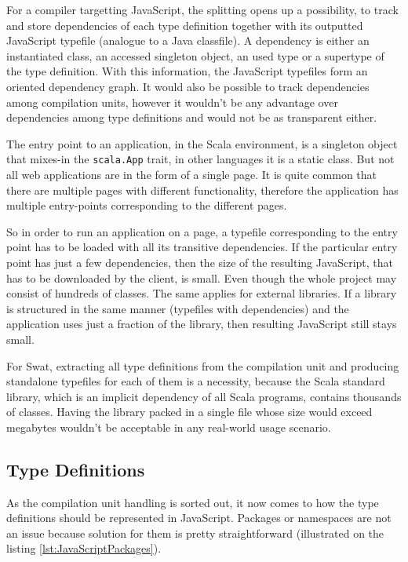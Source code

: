 \documentclass[12pt,a4paper]{report}
\begin{document}
For a compiler targetting JavaScript, the splitting opens up a possibility, to track and store dependencies of each type definition together with its outputted JavaScript typefile (analogue to a Java classfile). A dependency is either an instantiated class, an accessed singleton object, an used type or a supertype of the type definition. With this information, the JavaScript typefiles form an oriented dependency graph. It would also be possible to track dependencies among compilation units, however it wouldn't be any advantage over dependencies among type definitions and would not be as transparent either.

The entry point to an application, in the Scala environment, is a singleton object that mixes-in the \texttt{scala.App} trait, in other languages it is a static class. But not all web applications are in the form of a single page. It is quite common that there are multiple pages with different functionality, therefore the application has multiple entry-points corresponding to the different pages. 

So in order to run an application on a page, a typefile corresponding to the entry point has to be loaded with all its transitive dependencies. If the particular entry point has just a few dependencies, then the size of the resulting JavaScript, that has to be downloaded by the client, is small. Even though the whole project may consist of hundreds of classes. The same applies for external libraries. If a library is structured in the same manner (typefiles with dependencies) and the application uses just a fraction of the library, then resulting JavaScript still stays small.

For Swat, extracting all type definitions from the compilation unit and producing standalone typefiles for each of them is a necessity, because the Scala standard library\cite{ScalaLibrary}, which is an implicit dependency of all Scala programs, contains thousands of classes. Having the library packed in a single file whose size would exceed megabytes wouldn't be acceptable in any real-world usage scenario. 

\subsection{Type Definitions}

As the compilation unit handling is sorted out, it now comes to how the type definitions should be represented in JavaScript. Packages or namespaces are not an issue because solution for them is pretty straightforward (illustrated on the listing \ref{lst:JavaScriptPackages}).
\end{document}
